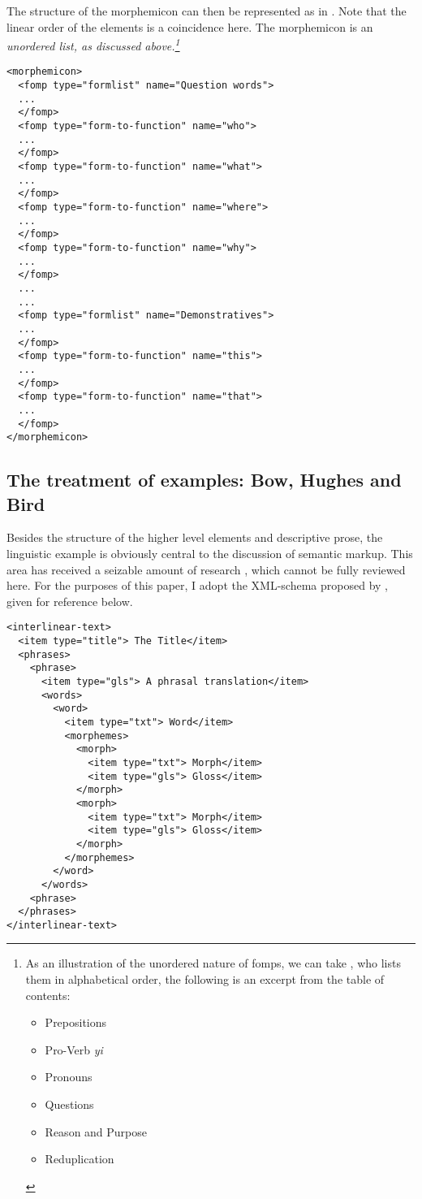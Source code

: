 The structure of the morphemicon can then be represented as in . Note that the linear order of the elements is a coincidence here. The morphemicon is an \em un\em ordered list, as discussed above.\footnote{As
  an illustration of the unordered nature of fomps, we can take \citet{Newman2000}, who lists them in alphabetical order, the following is an excerpt from the table of contents:
  \begin{itemize}
  \item Prepositions
  \item Pro-Verb \em yi\em
  \item Pronouns
  \item Questions
  \item Reason and Purpose
  \item Reduplication
  \end{itemize}
}	

\ea\label{xml:morphemicon}
\begin{verbatim}
<morphemicon>
  <fomp type="formlist" name="Question words">
  ...
  </fomp>
  <fomp type="form-to-function" name="who">
  ...
  </fomp>
  <fomp type="form-to-function" name="what">
  ...
  </fomp>
  <fomp type="form-to-function" name="where">
  ...
  </fomp>
  <fomp type="form-to-function" name="why">
  ...
  </fomp>
  ...
  ...
  <fomp type="formlist" name="Demonstratives">
  ...
  </fomp>
  <fomp type="form-to-function" name="this">
  ...
  </fomp>
  <fomp type="form-to-function" name="that">
  ...
  </fomp>
</morphemicon>
\end{verbatim}
\z


\subsection{The treatment of examples: Bow, Hughes and Bird}

Besides the structure of the higher level elements and descriptive prose, the linguistic example is obviously central to the discussion of semantic markup. This area has received a seizable amount of research \citep{Drude2002,Peterson2002,BowEtAl2003}, which cannot be fully reviewed here. For the purposes of this paper, I adopt the XML-schema proposed by \citet{BowEtAl2003}, given for reference below.

\ea\label{xml:bbh}
\begin{verbatim}
<interlinear-text>
  <item type="title"> The Title</item>
  <phrases>
    <phrase>
      <item type="gls"> A phrasal translation</item>
      <words>
        <word>
          <item type="txt"> Word</item>
          <morphemes>
            <morph>
              <item type="txt"> Morph</item>
              <item type="gls"> Gloss</item>
            </morph>
            <morph>
              <item type="txt"> Morph</item>
              <item type="gls"> Gloss</item>
            </morph>
          </morphemes>
        </word>
      </words>
    <phrase>
  </phrases>
</interlinear-text>
\end{verbatim}
\z

